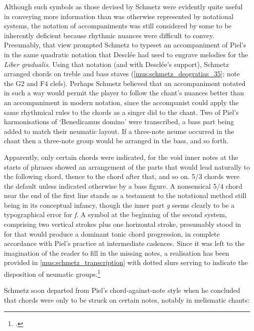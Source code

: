 Although such symbols as those devised by Schmetz were evidently quite useful in conveying more information than was otherwise represented by notational systems, the notation of accompaniments was still considered by some to be inherently deficient because rhythmic nuances were difficult to convey.
Presumably, that view prompted Schmetz to typeset an accompaniment of Piel's in the same quadratic notation that Desclée had used to engrave melodies for the \emph{Liber gradualis}.
\label{cc:schmetz}%
Using that notation (and with Desclée's support), Schmetz arranged chords on treble and bass staves (\cref{mus:schmetz_deogratias_35}; note the G2 and F4 clefs).
Perhaps Schmetz believed that an accompaniment notated in such a way would permit the player to follow the chant's nuances better than an accompaniment in modern notation, since the accompanist could apply the same rhythmical rules to the chords as a singer did to the chant.
Two of Piel's harmonisations of `Benedicamus domino' were transcribed, a bass part being added to match their neumatic layout.
If a three-note neume occurred in the chant then a three-note group would be arranged in the bass, and so forth.

Apparently, only certain chords were indicated, for the void inner notes at the starts of phrases showed an arrangement of the parts that would lead naturally to the following chord, thence to the chord after that, and so on.
5/3 chords were the default unless indicated otherwise by a bass figure.
A nonsensical 5/4 chord near the end of the first line stands as a testament to the notational method still being in its conceptual infancy, though the inner part \emph{g} seems clearly to be a typographical error for \emph{f}.
A symbol at the beginning of the second system, comprising two vertical strokes plus one horizontal stroke, presumably stood in for \sharp{} that would produce a dominant \rightarrow{} tonic chord progression, in complete accordance with Piel's practice at intermediate cadences.
Since it was left to the imagination of the reader to fill in the missing notes, a realisation has been provided in \cref{mus:schmetz_transcription} with dotted slurs serving to indicate the disposition of neumatic groups.\footcite[35; Although this text was published in Mainz, a note in the backmatter confirms it was printed by Desclée in Belgium]{SchmetzDomPothierLiber1884}

%
%
Schmetz soon departed from Piel's chord-against-note style when he concluded that chords were only to be struck on certain notes, notably in melismatic chants:

